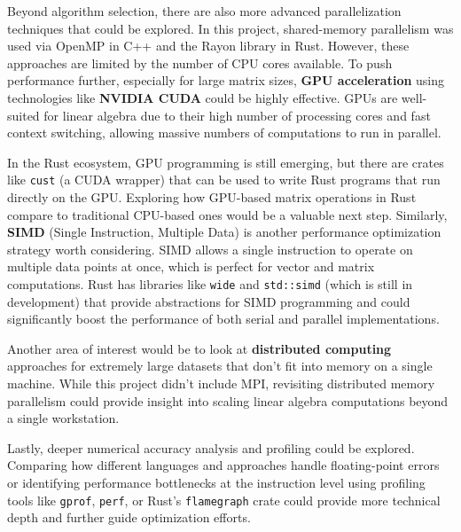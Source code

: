 \documentclass[12pt]{article}
\begin{document}
\vspace{1em}

Beyond algorithm selection, there are also more advanced parallelization techniques that could be explored. In this project, shared-memory
parallelism was used via OpenMP in C++ and the Rayon library in Rust. However, these approaches are limited by the number of CPU cores available.
To push performance further, especially for large matrix sizes, \textbf{GPU acceleration} using technologies like \textbf{NVIDIA CUDA} could be
highly effective. GPUs are well-suited for linear algebra due to their high number of processing cores and fast context switching, allowing massive
numbers of computations to run in parallel.

\vspace{1em}

In the Rust ecosystem, GPU programming is still emerging, but there are crates like \texttt{cust} (a CUDA wrapper) that can be used to write Rust
programs that run directly on the GPU. Exploring how GPU-based matrix operations in Rust compare to traditional CPU-based ones would be a valuable
next step. Similarly, \textbf{SIMD} (Single Instruction, Multiple Data) is another performance optimization strategy worth considering. SIMD allows
a single instruction to operate on multiple data points at once, which is perfect for vector and matrix computations. Rust has libraries like
\texttt{wide} and \texttt{std::simd} (which is still in development) that provide abstractions for SIMD programming and could significantly boost the
performance of both serial and parallel implementations.

\vspace{1em}

Another area of interest would be to look at \textbf{distributed computing} approaches for extremely large datasets that don't fit into memory on a
single machine. While this project didn't include MPI, revisiting distributed memory parallelism could provide insight into scaling linear algebra computations beyond a single workstation.

\vspace{1em}

Lastly, deeper numerical accuracy analysis and profiling could be explored. Comparing how different languages and approaches handle
floating-point errors or identifying performance bottlenecks at the instruction level using profiling tools like \texttt{gprof}, \texttt{perf}, or
Rust's \texttt{flamegraph} crate could provide more technical depth and further guide optimization efforts.
\end{document}
